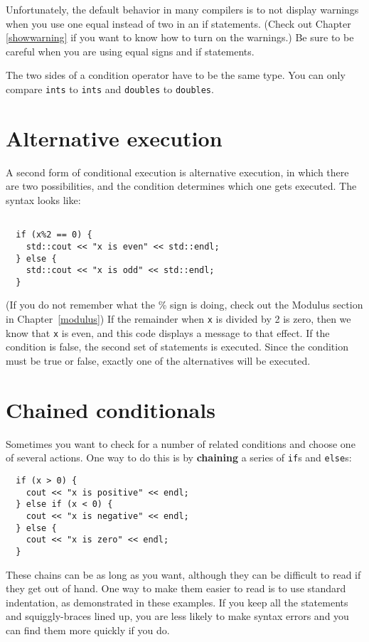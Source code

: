 Unfortunately, the default behavior in many compilers is to not display warnings when you use one equal instead of two in an if statements. (Check out Chapter \ref{showwarning} if you want to know how to turn on the warnings.) Be sure to be careful when you are using equal signs and if statements.

The two sides of a condition operator have to be the same
type.  You can only compare {\tt ints} to {\tt ints} and
{\tt doubles} to {\tt doubles}. 

\section {Alternative execution}
\label{alternative}

A second form of conditional execution is alternative execution,
in which there are two possibilities, and the condition determines
which one gets executed.  The syntax looks like:

\begin{lstlisting}
    
  if (x%2 == 0) {
    std::cout << "x is even" << std::endl;
  } else {
    std::cout << "x is odd" << std::endl;
  }
\end{lstlisting}
%
(If you do not remember what the \% sign is doing, check out the
Modulus section in Chapter~\ref{modulus})
If the remainder when {\tt x} is divided by 2 is zero, then
we know that {\tt x} is even, and this code displays a message
to that effect.  If the condition is false, the second
set of statements is executed.  Since the condition must
be true or false, exactly one of the alternatives will be
executed.



\section {Chained conditionals}

Sometimes you want to check for a number of related conditions
and choose one of several actions.  One way to do this is by
{\bf chaining} a series of {\tt if}s and {\tt else}s:

\begin{verbatim}
  if (x > 0) {
    cout << "x is positive" << endl;
  } else if (x < 0) {
    cout << "x is negative" << endl;
  } else {
    cout << "x is zero" << endl;
  }
\end{verbatim}
%
These chains can be as long as you want, although they can
be difficult to read if they get out of hand.  One way to
make them easier to read is to use standard indentation,
as demonstrated in these examples.  If you keep all the
statements and squiggly-braces lined up, you are less
likely to make syntax errors and you can find them more
quickly if you do.

